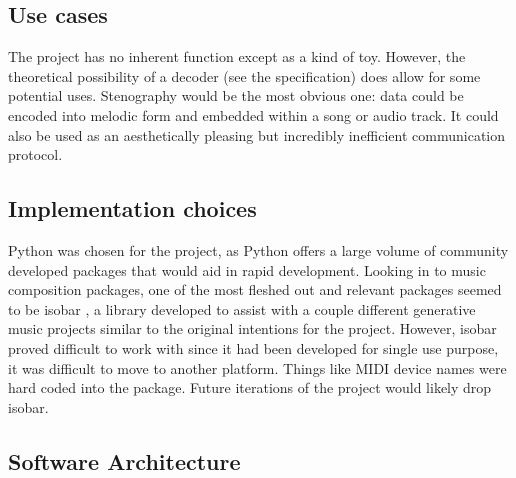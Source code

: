 \documentclass[runningheads,a4paper]{llncs}
\begin{document}

\subsection{Use cases} %

The project has no inherent function except as a kind of toy. However, the
theoretical possibility of a decoder (see the specification) does allow for some
potential uses. Stenography would be the most obvious one: data could be encoded
into melodic form and embedded within a song or audio track. It could also be
used as an aesthetically pleasing but incredibly inefficient communication
protocol.

\subsection{Implementation choices}

Python was chosen for the project, as Python offers a large volume of community
developed packages that would aid in rapid development. Looking in to music
composition packages, one of the most fleshed out and relevant packages seemed
to be isobar \cite{isobar}, a library developed to assist with a couple
different generative music projects similar to the original intentions for the
project. However, isobar proved difficult to work with since it had been
developed for single use purpose, it was difficult to move to another platform.
Things like MIDI device names were hard coded into the package. Future iterations
of the project would likely drop isobar.


\subsection{Software Architecture} %
\end{document}
